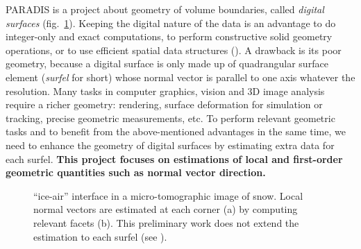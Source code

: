 

PARADIS is a project about geometry of volume boundaries,
called \emph{digital surfaces} (fig.~\ref{fig:snow}). 
Keeping the digital nature of the data is an advantage
to do integer-only and exact computations,
to perform constructive solid geometry operations,
or to use efficient spatial data structures
(\eg \cite{kampe2013sg,Villanueva:2016:SSS:2856400.2856420,JaspeVillanueva2017SSVDAG}).
A drawback is its poor geometry, because a digital surface is only 
made up of quadrangular surface element (\emph{surfel} for short) 
whose normal vector is parallel to one axis whatever the resolution. 
Many tasks in computer graphics, vision and 3D image analysis require a richer geometry: 
rendering, surface deformation for simulation or tracking, precise geometric measurements, etc.
To perform relevant geometric tasks and 
to benefit from the above-mentioned advantages in the same time, 
we need to enhance the geometry of digital surfaces by estimating extra data for each surfel. 
\textbf{This project focuses on estimations of local and first-order geometric quantities
such as normal vector direction.}

\begin{figure}[hb]
  \centering
%
%
%
%
%
\caption{``ice-air'' interface in a micro-tomographic image of
  snow\protect\footnotemark. Local normal vectors are estimated
  at each corner (a) by computing relevant facets (b). This
  preliminary work does not extend the estimation to each surfel
  (see ). } 
\label{fig:snow} 
\end{figure}

